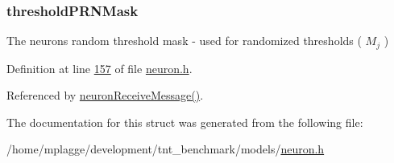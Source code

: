\hypertarget{structneuron_state_aa501d6ee7cacd5435deec79c07637b08}{}
\subsubsection[{threshold\+P\+R\+N\+Mask}]{ threshold\+P\+R\+N\+Mask}\label{structneuron_state_aa501d6ee7cacd5435deec79c07637b08}


The neuron\textquotesingle{}s random threshold mask -\/ used for randomized thresholds ( $M_j$ ) 



Definition at line \hyperlink{neuron_8h_source_l00157}{157} of file \hyperlink{neuron_8h_source}{neuron.\+h}.



Referenced by \hyperlink{neuron_8c_source_l00103}{neuron\+Receive\+Message()}.



The documentation for this struct was generated from the following file\+:\begin{DoxyCompactItemize}
\item 
/home/mplagge/development/tnt\+\_\+benchmark/models/\hyperlink{neuron_8h}{neuron.\+h}\end{DoxyCompactItemize}
